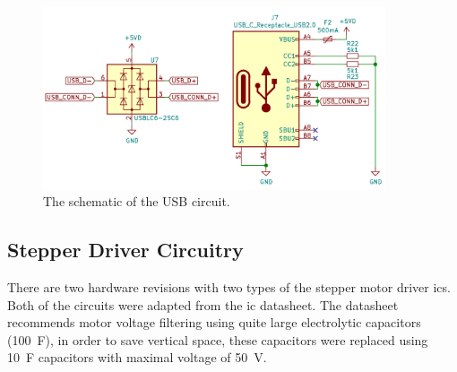 \begin{figure}[H]
    \centering
    \includegraphics[width=0.9\textwidth]{obrazky/schem_usb}
    \caption{The schematic of the USB circuit.}
    \label{fig:schem_usb}
\end{figure}

\subsection{Stepper Driver Circuitry}
\label{subsec:stepper_circuitry}
There are two hardware revisions with two types of the stepper motor driver \acs{ic}s.
Both of the circuits were adapted from the \acs{ic} datasheet\cite{trinamic_tmc2100-datasheet_2018, trinamic_tmc2226_2020}.
The datasheet recommends motor voltage filtering using quite large electrolytic capacitors (100~\textmu F), in order to save vertical space, these capacitors were replaced using 10~\textmu F capacitors with maximal voltage of 50~V.

